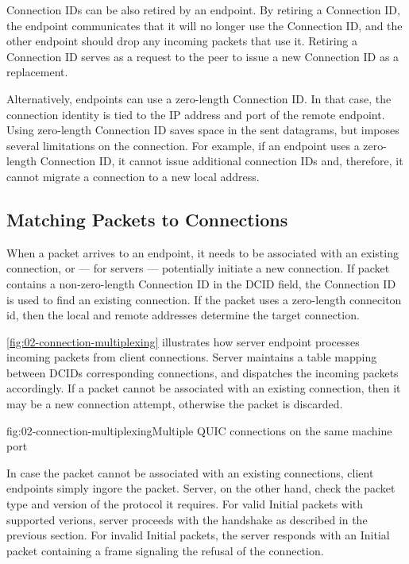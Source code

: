 Connection IDs can be also retired by an endpoint. By retiring a Connection ID, the endpoint
communicates that it will no longer use the Connection ID, and the other endpoint should drop any
incoming packets that use it. Retiring a Connection ID serves as a request to the peer to issue a
new Connection ID as a replacement.

Alternatively, endpoints can use a zero-length Connection ID. In that case, the connection identity
is tied to the IP address and port of the remote endpoint. Using zero-length Connection ID saves
space in the sent datagrams, but imposes several limitations on the connection. For example, if an
endpoint uses a zero-length Connection ID, it cannot issue additional connection IDs and, therefore,
it cannot migrate a connection to a new local address.

\subsection{Matching Packets to Connections}

When a packet arrives to an endpoint, it needs to be associated with an existing connection, or ---
for servers --- potentially initiate a new connection. If packet contains a non-zero-length Connection
ID in the DCID field, the Connection ID is used to find an existing connection. If the packet uses a zero-length conneciton id, then the local and remote addresses determine the target connection.

\autoref{fig:02-connection-multiplexing} illustrates how server endpoint processes incoming packets
from client connections. Server maintains a table mapping between DCIDs corresponding connections,
and dispatches the incoming packets accordingly. If a packet cannot be associated with an existing
connection, then it may be a new connection attempt, otherwise the packet is discarded.

\begin{myFigure}{fig:02-connection-multiplexing}{Multiple QUIC connections on the same machine port}




\end{myFigure}

In case the packet cannot be associated with an existing connections, client endpoints simply ingore
the packet. Server, on the other hand, check the packet type and version of the protocol it
requires. For valid Initial packets with supported verions, server proceeds with the handshake as
described in the previous section. For invalid Initial packets, the server responds with an Initial
packet containing a \CONNECTIONCLOSE{} frame signaling the refusal of the connection.

